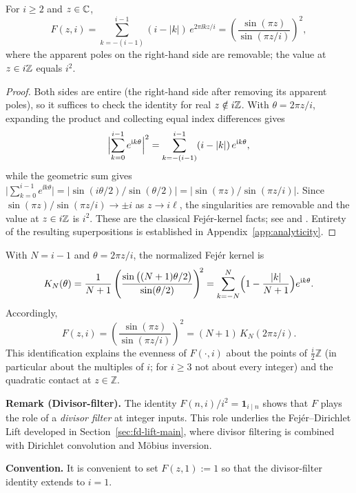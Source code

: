 \begin{proposition}
\label{prop:fejer-closed}
For $i\ge2$ and $z\in\mathbb{C}$,
\[
F(z,i)=\sum_{k=-(i-1)}^{i-1}(i-|k|)\,e^{2\pi \ii k z/i}
=\left(\frac{\sin(\pi z)}{\sin(\pi z/i)}\right)^2,
\]
where the apparent poles on the right-hand side are removable; the value at $z\in i\mathbb{Z}$ equals $i^2$.
\end{proposition}
\begin{proof}
Both sides are entire (the right-hand side after removing its apparent poles), so it suffices to check the identity for real $z\notin i\mathbb{Z}$. With $\theta=2\pi z/i$, expanding the product and collecting equal index differences gives
\[
\Bigl|\sum_{k=0}^{i-1}e^{\mathrm{i} k\theta}\Bigr|^{2}=\sum_{k=-(i-1)}^{i-1}(i-|k|)\,e^{\mathrm{i} k\theta},
\]
while the geometric sum gives $\bigl|\sum_{k=0}^{i-1}e^{\ii k\theta}\bigr|=\bigl|\sin(i\theta/2)/\sin(\theta/2)\bigr|=\bigl|\sin(\pi z)/\sin(\pi z/i)\bigr|$. Since $\sin(\pi z)/\sin(\pi z/i)\to\pm i$ as $z\to i\ell$, the singularities are removable and the value at $z\in i\mathbb{Z}$ is $i^2$. These are the classical Fej\'er-kernel facts; see \cite[Ch.~I]{katznelson2004} and \cite[Ch.~I]{zygmund2002}. Entirety of the resulting superpositions is established in Appendix~\ref{app:analyticity}.
\end{proof}

\begin{remark}
With $N=i-1$ and $\theta=2\pi z/i$, the normalized Fej\'er kernel is
\[
K_N(\theta)=\frac{1}{N+1}\left(\frac{\sin\big((N+1)\theta/2\big)}{\sin(\theta/2)}\right)^{\!2}
=\sum_{k=-N}^{N}\Bigl(1-\frac{|k|}{N+1}\Bigr)e^{\mathrm{i} k\theta}.
\]
Accordingly,
\[
F(z,i)=\left(\frac{\sin(\pi z)}{\sin(\pi z/i)}\right)^{\!2}
=(N+1)\,K_N(2\pi z/i).
\]
This identification explains the evenness of $F(\cdot,i)$ about the points of $\tfrac{i}{2}\mathbb Z$ (in particular about the multiples of $i$; for $i\ge3$ not about every integer) and the quadratic contact at $z\in\mathbb Z$.
\end{remark}


\noindent\textbf{Remark (Divisor-filter).} The identity $F(n,i)/i^2=\mathbf{1}_{i\mid n}$ shows that $F$ plays the role of a \emph{divisor filter} at integer inputs.
This role underlies the Fej\'er--Dirichlet Lift developed in Section~\ref{sec:fd-lift-main}, where divisor filtering is combined with Dirichlet convolution and M\"obius inversion.

\medskip
\noindent\textbf{Convention.} It is convenient to set $F(z,1):=1$ so that the divisor-filter identity extends to $i=1$.

